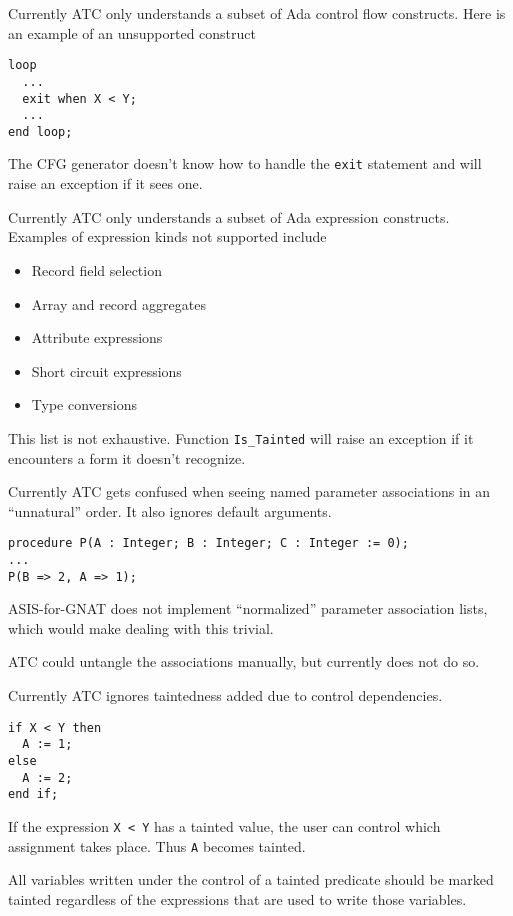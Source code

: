 \documentclass[landscape]{slides}
\begin{document}
Currently ATC only understands a subset of Ada control flow constructs. Here is an example of an
unsupported construct
\begin{verbatim}
loop
  ...
  exit when X < Y;
  ...
end loop;
\end{verbatim}
The CFG generator doesn't know how to handle the \texttt{exit} statement and will raise an
exception if it sees one.
\stopslide

Currently ATC only understands a subset of Ada expression constructs. Examples of expression
kinds not supported include
\begin{itemize}
\item Record field selection
\item Array and record aggregates
\item Attribute expressions
\item Short circuit expressions
\item Type conversions
\end{itemize}
This list is not exhaustive. Function \texttt{Is\_Tainted} will raise an exception if it
encounters a form it doesn't recognize.
\stopslide

Currently ATC gets confused when seeing named parameter associations in an ``unnatural'' order.
It also ignores default arguments.
\begin{verbatim}
procedure P(A : Integer; B : Integer; C : Integer := 0);
...
P(B => 2, A => 1);
\end{verbatim}
ASIS-for-GNAT does not implement ``normalized'' parameter association lists, which would make
dealing with this trivial.

ATC could untangle the associations manually, but currently does not do so.
\stopslide

Currently ATC ignores taintedness added due to control dependencies.
\begin{verbatim}
if X < Y then
  A := 1;
else
  A := 2;
end if;
\end{verbatim}
If the expression \texttt{X < Y} has a tainted value, the user can control which assignment
takes place. Thus \texttt{A} becomes tainted.

All variables written under the control of a tainted predicate should be marked tainted
regardless of the expressions that are used to write those variables.
\stopslide
\end{document}
